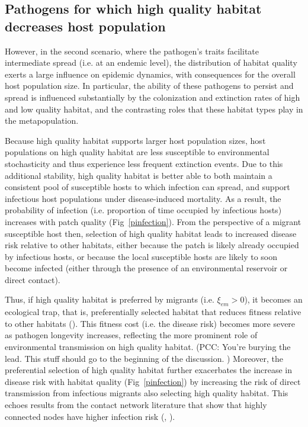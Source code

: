 \documentclass{article}
\begin{document}
\subsection*{Pathogens for which high quality habitat decreases host population}

However, in the second scenario, where the pathogen's traits facilitate intermediate spread (i.e. at an endemic level), the distribution of habitat quality exerts a large influence on epidemic dynamics, with consequences for the overall host population size.
In particular, the ability of these pathogens to persist and spread is influenced substantially by the colonization and extinction rates of high and low quality habitat, and the contrasting roles that these habitat types play in the metapopulation.
 
Because high quality habitat supports larger host population sizes, host populations on high quality habitat are less susceptible to environmental stochasticity and thus experience less frequent extinction events.
Due to this additional stability, high quality habitat is better able to both maintain a consistent pool of susceptible hosts to which infection can spread, and support infectious host populations under disease-induced mortality. 
As a result, the probability of infection (i.e. proportion of time occupied by infectious hosts) increases with patch quality (Fig~\ref{pinfection}).
From the perspective of a migrant susceptible host then, selection of high quality habitat leads to increased disease risk relative to other habitats, either because the patch is likely already occupied by infectious hosts, or because the local susceptible hosts are likely to soon become infected (either through the presence of an environmental reservoir or direct contact).

Thus, if high quality habitat is preferred by migrants (i.e. $\xi_{em} > 0$), it becomes an ecological trap, that is, preferentially selected habitat that reduces fitness relative to other habitats (\cite{Robertson2006}).
This fitness cost (i.e. the disease risk) becomes more severe as pathogen longevity increases, reflecting the more prominent role of environmental transmission on high quality habitat. (PCC: You're burying the lead. This stuff should go to the beginning of the discussion. )
Moreover, the preferential selection of high quality habitat further exacerbates the increase in disease risk with habitat quality (Fig~\ref{pinfection}) by increasing the risk of direct transmission from infectious migrants also selecting high quality habitat.
This echoes results from the contact network literature that show that highly connected nodes have higher infection risk (\cite{Christley2005}, \cite{Keeling2005}).
\end{document}
